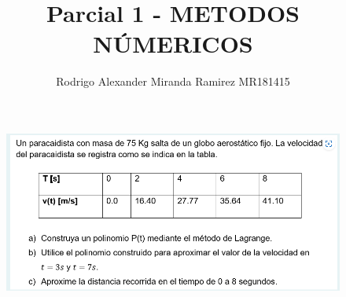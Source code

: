\documentclass{article}
\title{Parcial 1 - METODOS NÚMERICOS}
\author{Rodrigo Alexander Miranda Ramirez MR181415}
\theoremstyle{mytheoremstyle}
\theoremstyle{mytheoremstyle}
\theoremstyle{myproblemstyle}
\begin{document}
    \maketitle
    \begin{figure}[ht]
        \includegraphics[scale=0.8]{img/eje1_1.png}
     \end{figure}
\end{document}

